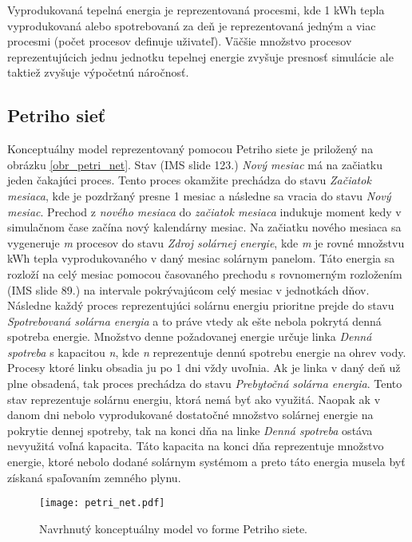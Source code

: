 \documentclass[a4paper, 11pt]{article}
\begin{document}
Vyprodukovaná tepelná energia je reprezentovaná procesmi, kde 1 kWh tepla vyprodukovaná alebo spotrebovaná za deň je reprezentovaná jedným a viac procesmi (počet procesov definuje uživateľ). Väčšie množstvo procesov reprezentujúcich jednu jednotku tepelnej energie zvyšuje presnosť simulácie ale taktiež zvyšuje výpočetnú náročnosť. 


\subsection{Petriho sieť} \label{petri_net_section}
Konceptuálny model reprezentovaný pomocou Petriho siete je priložený na obrázku \ref{obr_petri_net}. Stav (IMS\cite{ims_slides} slide 123.) \textit{Nový mesiac} má na začiatku jeden čakajúci proces. Tento proces okamžite prechádza do stavu \textit{Začiatok mesiaca}, kde je pozdržaný presne 1 mesiac a následne sa vracia do stavu \textit{Nový mesiac}. Prechod z \textit{nového mesiaca} do \textit{začiatok mesiaca} indukuje moment kedy v simulačnom čase začína nový kalendárny mesiac. Na začiatku nového mesiaca sa vygeneruje \textit{m} procesov do stavu \textit{Zdroj solárnej energie}, kde \textit{m} je rovné množstvu kWh tepla vyprodukovaného v daný mesiac solárnym panelom. Táto energia sa rozloží na celý mesiac pomocou časovaného prechodu s rovnomerným rozložením (IMS\cite{ims_slides} slide 89.) na intervale pokrývajúcom celý mesiac v jednotkách dňov. Následne každý proces reprezentujúci solárnu energiu prioritne prejde do stavu \textit{Spotrebovaná solárna energia} a to práve vtedy ak ešte nebola pokrytá denná spotreba energie. Množstvo denne požadovanej energie určuje linka \textit{Denná spotreba} s kapacitou \textit{n}, kde \textit{n} reprezentuje dennú spotrebu energie na ohrev vody. Procesy ktoré linku obsadia ju po 1 dni vždy uvoľnia. Ak je linka v daný deň už plne obsadená, tak proces prechádza do stavu \textit{Prebytočná solárna energia}. Tento stav reprezentuje solárnu energiu, ktorá nemá byť ako využitá. Naopak ak v danom dni nebolo vyprodukované dostatočné množstvo solárnej energie na pokrytie dennej spotreby, tak na konci dňa na linke \textit{Denná spotreba} ostáva nevyužitá voľná kapacita. Táto kapacita na konci dňa reprezentuje množstvo energie, ktoré nebolo dodané solárnym systémom a preto táto energia musela byť získaná spaľovaním zemného plynu.


\begin{figure}[h] 
	\centering
	\texttt{[image: petri\_net.pdf]}
	\caption{Navrhnutý konceptuálny model vo forme Petriho siete.}
	\label{obr1}
\end{figure} \label{obr_petri_net}
\end{document}
